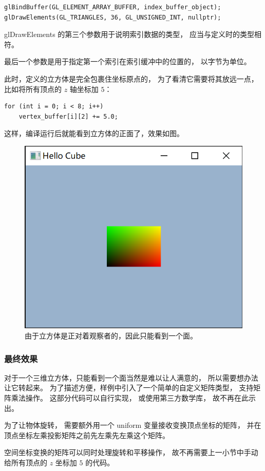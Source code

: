 \documentclass[fontset=windows]{ctexart}
\begin{document}
\begin{lstlisting}
glBindBuffer(GL_ELEMENT_ARRAY_BUFFER, index_buffer_object);
glDrawElements(GL_TRIANGLES, 36, GL_UNSIGNED_INT, nullptr);
\end{lstlisting}

glDrawElements 的第三个参数用于说明索引数据的类型，
应当与定义时的类型相符。

最后一个参数是用于指定第一个索引在索引缓冲中的位置的，
以字节为单位。

此时，定义的立方体是完全包裹住坐标原点的，
为了看清它需要将其放远一点，比如将所有顶点的 $z$ 轴坐标加 $5$：

\begin{lstlisting} 
for (int i = 0; i < 8; i++)
    vertex_buffer[i][2] += 5.0;
\end{lstlisting}

这样，编译运行后就能看到立方体的正面了，效果如图。

\begin{figure}[htbp]
\centering
\includegraphics[width=0.5\linewidth]{imgs/sec 4.6/hello-cube.png}
\caption{由于立方体是正对着观察者的，因此只能看到一个面。}
\end{figure}

\subsubsection{最终效果}

对于一个三维立方体，只能看到一个面当然是难以让人满意的，
所以需要想办法让它转起来。
为了描述方便，样例中引入了一个简单的自定义矩阵类型，
支持矩阵乘法操作。
这部分代码可以自行实现，
或使用第三方数学库，
故不再在此示出。

为了让物体旋转，
需要额外用一个 uniform 变量接收变换顶点坐标的矩阵，
并在顶点坐标左乘投影矩阵之前先左乘先左乘这个矩阵。

空间坐标变换的矩阵可以同时处理旋转和平移操作，
故不再需要上一小节中手动给所有顶点的 $z$ 坐标加 $5$ 的代码。
\end{document}
